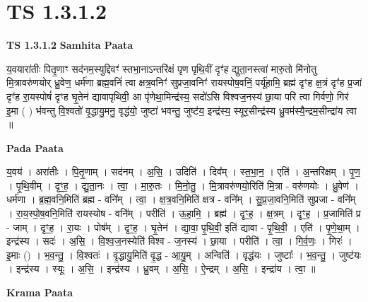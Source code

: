 \documentclass[17pt]{extarticle}
\begin{document}
\section*{ TS 1.3.1.2 }

\textbf{TS 1.3.1.2 } \newline
\textbf{Samhita Paata} \newline

य॒वयारा॑तीः पितृ॒णाꣳ सद॑नम॒स्युद्दिवꣳ॑ स्तभा॒नाऽन्तरि॑क्षं पृण पृथि॒वीं दृꣳ॑ह द्युता॒नस्त्वा॑ मारु॒तो मि॑नोतु मि॒त्रावरु॑णयोर् ध्रु॒वेण॒ धर्म॑णा ब्रह्म॒वनिं॑ त्वा क्षत्र॒वनिꣳ॑ सुप्रजा॒वनिꣳ॑ रायस्पोष॒वनिं॒ पर्यू॑हामि॒ ब्रह्म॑ दृꣳह क्ष॒त्रं दृꣳ॑ह प्र॒जां दृꣳ॑ह रा॒यस्पोषं॑ दृꣳह घृ॒तेन॑ द्यावापृथिवी॒ आ पृ॑णेथा॒मिन्द्र॑स्य॒ सदो॑ऽसि विश्वज॒नस्य॑ छा॒या परि॑ त्वा गिर्वणो॒ गिर॑ इ॒मा ( ) भ॑वन्तु वि॒श्वतो॑ वृ॒द्धायु॒मनु॒ वृद्ध॑यो॒ जुष्टा॑ भवन्तु॒ जुष्ट॑य॒ इन्द्र॑स्य॒ स्यूर॒सीन्द्र॑स्य ध्रु॒वम॑स्यै॒न्द्रम॒सीन्द्रा॑य त्वा ॥ \newline

\textbf{Pada Paata} \newline

य॒वय॑ । अरा॑तीः । पि॒तृ॒णाम् । सद॑नम् । अ॒सि॒ । उदिति॑ । दिव᳚म् । स्त॒भा॒न॒ । एति॑ । अ॒न्तरि॑क्षम् । पृ॒ण॒ । पृ॒थि॒वीम् । दृꣳ॒॒ह॒ । द्यु॒ता॒नः । त्वा॒ । मा॒रु॒तः । मि॒नो॒तु॒ । मि॒॒त्रावरु॑णयो॒रिति॑ मि॒त्रा - वरु॑णयोः । ध्रु॒वेण॑ । धर्म॑णा । ब्र॒ह्म॒वनि॒मिति॑ ब्रह्म - वनि᳚म् । त्वा॒ । क्ष॒त्र॒वनि॒मिति॑ क्षत्र - वनि᳚म् । सु॒प्र॒जा॒वनि॒मिति॑ सुप्रजा - वनि᳚म् । रा॒य॒स्पो॒ष॒वनि॒मिति॑ रायस्योष - वनि᳚म् । परीति॑ । ऊ॒हा॒मि॒ । ब्रह्म॑ । दृꣳ॒॒ह॒ । क्ष॒त्रम् । दृꣳ॒॒ह॒ । प्र॒जामिति॑ प्र - जाम् । दृꣳ॒॒ह॒ । रा॒यः । पोष᳚म् । दृꣳ॒॒ह॒ । घृ॒तेन॑ । द्या॒वा॒ पृ॒थि॒वी॒ इति॑ द्यावा - पृ॒थि॒वी॒ । एति॑ । पृ॒णे॒था॒म् । इन्द्र॑स्य । सदः॑ । अ॒सि॒ । वि॒श्व॒ज॒नस्येति॑ विश्व - ज॒नस्य॑ । छा॒या । परीति॑ । त्वा॒ । गि॒र्व॒णः॒ । गिरः॑ । इ॒माः () । भ॒व॒न्तु॒ । वि॒श्वतः॑ । वृ॒द्धायु॒मिति॑ वृ॒द्ध - आ॒यु॒म् । अन्विति॑ । वृद्ध॑यः । जुष्टाः᳚ । भ॒व॒न्तु॒ । जुष्ट॑यः । इन्द्र॑स्य । स्यूः । अ॒सि॒ । इन्द्र॑स्य । ध्रु॒वम् । अ॒सि॒ । ऐ॒न्द्रम् । अ॒सि॒ । इन्द्रा॑य । त्वा॒ ॥  \newline


\textbf{Krama Paata} \newline
\end{document}
